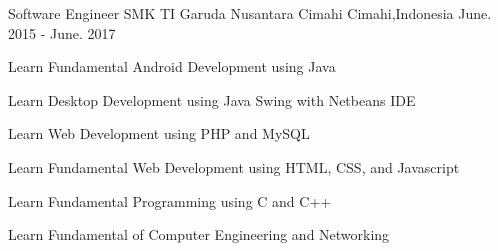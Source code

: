 

\begin{cventries}

  \cventry
    {Software Engineer} %
    {SMK TI Garuda Nusantara Cimahi} %
    {Cimahi,Indonesia} %
    {June. 2015 - June. 2017} %
    {
      \begin{cvitems} %
        \item {Learn Fundamental Android Development using Java}
        \item {Learn Desktop Development using Java Swing with Netbeans IDE}
        \item {Learn Web Development using PHP and MySQL}
        \item {Learn Fundamental Web Development using HTML, CSS, and Javascript}
        \item {Learn Fundamental Programming using C and C++}
        \item {Learn Fundamental of Computer Engineering and Networking}
      \end{cvitems}
    }

\end{cventries}